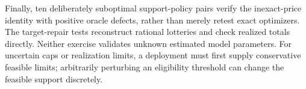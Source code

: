 Finally, ten deliberately suboptimal support-policy pairs verify the inexact-price identity with positive oracle defects, rather than merely retest exact optimizers. The target-repair tests reconstruct rational lotteries and check realized totals directly. Neither exercise validates unknown estimated model parameters. For uncertain caps or realization limits, a deployment must first supply conservative feasible limits; arbitrarily perturbing an eligibility threshold can change the feasible support discretely.
